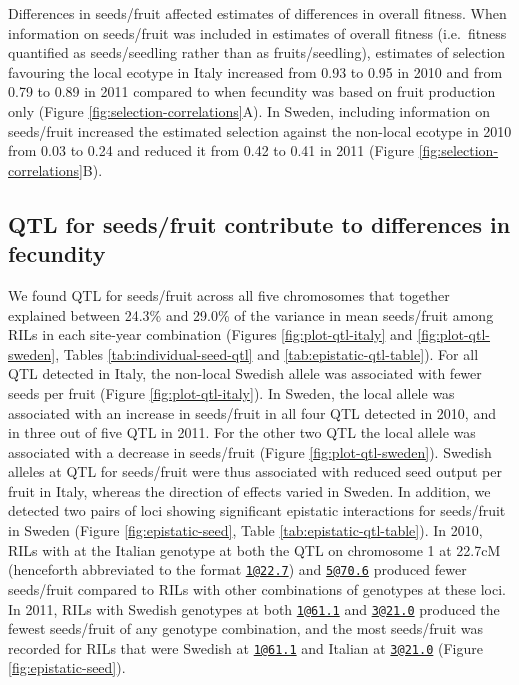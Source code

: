 \documentclass[]{article}
\begin{document}
Differences in seeds/fruit affected estimates of differences in overall fitness. When information on seeds/fruit was included in estimates of overall fitness (i.e.~fitness quantified as seeds/seedling rather than as fruits/seedling), estimates of selection favouring the local ecotype in Italy increased from
0.93
to
0.95
in 2010 and from
0.79
to
0.89
in 2011 compared to when fecundity was based on fruit production only (Figure \ref{fig:selection-correlations}A). In Sweden, including information on seeds/fruit increased the estimated selection against the non-local ecotype in 2010 from
0.03
to
0.24
and reduced it from
0.42
to
0.41
in 2011 (Figure \ref{fig:selection-correlations}B).

\hypertarget{qtl-for-seedsfruit-contribute-to-differences-in-fecundity}{%
\subsection{QTL for seeds/fruit contribute to differences in fecundity}\label{qtl-for-seedsfruit-contribute-to-differences-in-fecundity}}

We found QTL for seeds/fruit across all five chromosomes that together explained between 24.3\% and 29.0\% of the variance in mean seeds/fruit among RILs in each site-year combination (Figures \ref{fig:plot-qtl-italy} and \ref{fig:plot-qtl-sweden}, Tables \ref{tab:individual-seed-qtl} and \ref{tab:epistatic-qtl-table}). For all QTL detected in Italy, the non-local Swedish allele was associated with fewer seeds per fruit (Figure \ref{fig:plot-qtl-italy}). In Sweden, the local allele was associated with an increase in seeds/fruit in all four QTL detected in 2010, and in three out of five QTL in 2011. For the other two QTL the local allele was associated with a decrease in seeds/fruit (Figure \ref{fig:plot-qtl-sweden}). Swedish alleles at QTL for seeds/fruit were thus associated with reduced seed output per fruit in Italy, whereas the direction of effects varied in Sweden. In addition, we detected two pairs of loci showing significant epistatic interactions for seeds/fruit in Sweden (Figure \ref{fig:epistatic-seed}, Table \ref{tab:epistatic-qtl-table}). In 2010, RILs with at the Italian genotype at both the QTL on chromosome 1 at 22.7cM (henceforth abbreviated to the format \href{mailto:1@22.7}{\nolinkurl{1@22.7}}) and \href{mailto:5@70.6}{\nolinkurl{5@70.6}} produced fewer seeds/fruit compared to RILs with other combinations of genotypes at these loci. In 2011, RILs with Swedish genotypes at both \href{mailto:1@61.1}{\nolinkurl{1@61.1}} and \href{mailto:3@21.0}{\nolinkurl{3@21.0}} produced the fewest seeds/fruit of any genotype combination, and the most seeds/fruit was recorded for RILs that were Swedish at \href{mailto:1@61.1}{\nolinkurl{1@61.1}} and Italian at \href{mailto:3@21.0}{\nolinkurl{3@21.0}} (Figure \ref{fig:epistatic-seed}).
\end{document}
